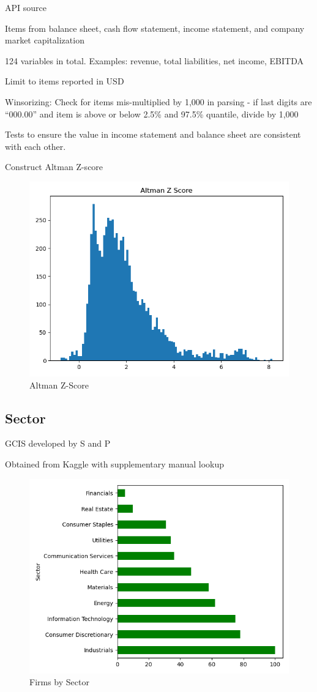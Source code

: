 \documentclass{article}
\begin{document}
    API source

    Items from balance sheet, cash flow statement, income statement, and company market capitalization
    
    124 variables in total. Examples: revenue, total liabilities, net income, EBITDA
    
    Limit to items reported in USD
    
    Winsorizing: Check for items mis-multiplied by 1,000 in parsing - if last digits are “000.00” and item is above or below 2.5\% and 97.5\% quantile, divide by 1,000

    Tests to ensure the value in income statement and balance sheet are consistent with each other.

    Construct Altman Z-score

    \begin{figure}[h!]
		\centering
        \caption{Altman Z-Score}
        \includegraphics[width=0.5\linewidth,keepaspectratio=true]{../Output/All Data EDA/Tabular EDA/altman_z_score_all_data.png}
	\end{figure}    

    \subsection*{Sector}

    GCIS developed by S and P

    Obtained from Kaggle with supplementary manual lookup

    \begin{figure}[h!]
		\centering
        \caption{Firms by Sector}
        \includegraphics[width=0.5\linewidth,keepaspectratio=true]{../Output/All Data EDA/Tabular EDA/all_data_fixed_quarter_dates_firms_by_sector_no_title.png}
	\end{figure}
\end{document}

